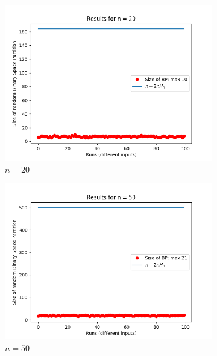 \documentclass[letterpaper]{article}
\begin{document}
\begin{figure}[H]
    \begin{subfigure}{.33\textwidth}
      \centering
      \includegraphics[width=1\linewidth]{images/assign1/triangle/inputs_20}
      \caption{$n = 20$}
    \end{subfigure}
    \begin{subfigure}{.33\textwidth}
      \centering
      \includegraphics[width=1\linewidth]{images/assign1/triangle/inputs_50}
      \caption{$n = 50$}
    \end{subfigure}
    \begin{subfigure}{.33\textwidth}
      \centering

\end{subfigure}
\end{figure}
\end{document}
